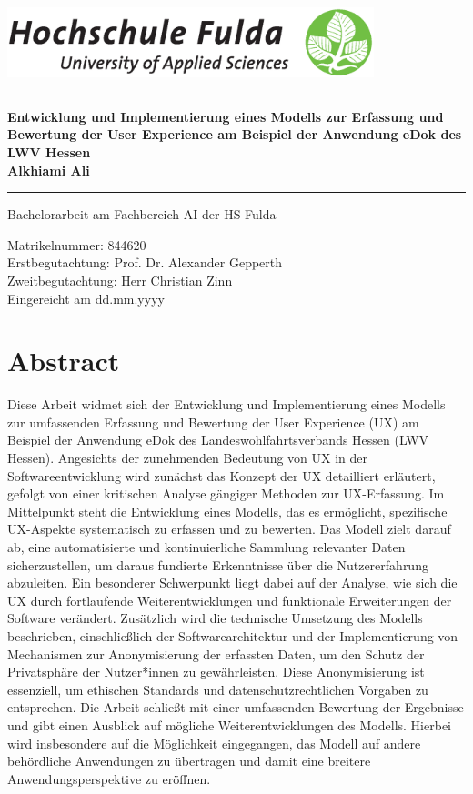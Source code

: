\documentclass[12pt,oneside]{article}
\newcommand{\HSFTitle}[8]{

  \thispagestyle{empty}
\begin{center}
    \includegraphics[width=0.8\textwidth]{logo.eps} \\
    \vspace*{\stretch{1}}
    \end{center}

  {\parindent0cm
  \rule{\linewidth}{.7ex}}
  \begin{center}
    \vspace*{\stretch{1}}
    \sffamily\bfseries\Huge
    #1\\
    \vspace*{\stretch{1}}
    \sffamily\bfseries\large
    #3
    \vspace*{\stretch{1}}
  \end{center}
  \rule{\linewidth}{.7ex}

  \vspace*{\stretch{2}}
  \begin{center}
    \Large #2 am #5 der HS Fulda \\
    \vspace*{\stretch{1}}

    \large Matrikelnummer:  #4 \\[1mm]
    \large Erstbegutachtung:  #7 \\[1mm]
    \large Zweitbegutachtung:  #8 \\[1mm]

    \vspace*{\stretch{1}}
    \large Eingereicht am #6
  \end{center}
}
\begin{document}
  \HSFTitle
      {Entwicklung und Implementierung eines Modells zur Erfassung und Bewertung der User Experience am Beispiel der Anwendung eDok des LWV Hessen }        %
      {Bachelorarbeit} %
      {Alkhiami Ali}          %
      {844620}
      {Fachbereich AI}  %
      {dd.mm.yyyy}        %
      {Prof. Dr. Alexander Gepperth}     %
      {Herr Christian Zinn}    %

  \clearpage

\lhead{}
    \setcounter{page}{1}

\clearpage
%
\section*{Abstract}
Diese Arbeit widmet sich der Entwicklung und Implementierung eines Modells zur umfassenden Erfassung und Bewertung der User Experience (UX) am Beispiel der Anwendung eDok des Landeswohlfahrtsverbands Hessen (LWV Hessen). Angesichts der zunehmenden Bedeutung von UX in der Softwareentwicklung wird zunächst das Konzept der UX detailliert erläutert, gefolgt von einer kritischen Analyse gängiger Methoden zur UX-Erfassung. Im Mittelpunkt steht die Entwicklung eines Modells, das es ermöglicht, spezifische UX-Aspekte systematisch zu erfassen und zu bewerten. Das Modell zielt darauf ab, eine automatisierte und kontinuierliche Sammlung relevanter Daten sicherzustellen, um daraus fundierte Erkenntnisse über die Nutzererfahrung abzuleiten. Ein besonderer Schwerpunkt liegt dabei auf der Analyse, wie sich die UX durch fortlaufende Weiterentwicklungen und funktionale Erweiterungen der Software verändert. Zusätzlich wird die technische Umsetzung des Modells beschrieben, einschließlich der Softwarearchitektur und der Implementierung von Mechanismen zur Anonymisierung der erfassten Daten, um den Schutz der Privatsphäre der Nutzer*innen zu gewährleisten. Diese Anonymisierung ist essenziell, um ethischen Standards und datenschutzrechtlichen Vorgaben zu entsprechen. Die Arbeit schließt mit einer umfassenden Bewertung der Ergebnisse und gibt einen Ausblick auf mögliche Weiterentwicklungen des Modells. Hierbei wird insbesondere auf die Möglichkeit eingegangen, das Modell auf andere behördliche Anwendungen zu übertragen und damit eine breitere Anwendungsperspektive zu eröffnen.
\end{document}
